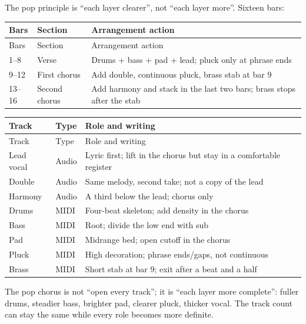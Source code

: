 The pop principle is ``each layer clearer'', not ``each layer more''. Sixteen bars:

\begin{longtable}{p{}p{}p{}}
\toprule
Bars & Section & Arrangement action \\
\midrule
\endfirsthead
\toprule
Bars & Section & Arrangement action \\
\midrule
\endhead
1--8 & Verse & Drums + bass + pad + lead; pluck only at phrase ends \\
9--12 & First chorus & Add double, continuous pluck, brass stab at bar 9 \\
13--16 & Second chorus & Add harmony and stack in the last two bars; brass stops after the stab \\
\bottomrule
\end{longtable}

\begin{longtable}{p{}p{}p{}}
\toprule
Track & Type & Role and writing \\
\midrule
\endfirsthead
\toprule
Track & Type & Role and writing \\
\midrule
\endhead
Lead vocal & Audio & Lyric first; lift in the chorus but stay in a comfortable register \\
Double & Audio & Same melody, second take; not a copy of the lead \\
Harmony & Audio & A third below the lead; chorus only \\
Drums & MIDI & Four-beat skeleton; add density in the chorus \\
Bass & MIDI & Root; divide the low end with sub \\
Pad & MIDI & Midrange bed; open cutoff in the chorus \\
Pluck & MIDI & High decoration; phrase ends/gaps, not continuous \\
Brass & MIDI & Short stab at bar 9; exit after a beat and a half \\
\bottomrule
\end{longtable}

The pop chorus is not ``open every track''; it is ``each layer more complete'': fuller drums, steadier bass, brighter pad, clearer pluck, thicker vocal. The track count can stay the same while every role becomes more definite.

